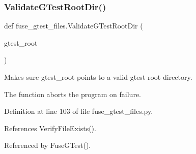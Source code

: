 \subsubsection{\texorpdfstring{Validate\+G\+Test\+Root\+Dir()}{ValidateGTestRootDir()}}
{\footnotesize\ttfamily def fuse\+\_\+gtest\+\_\+files.\+Validate\+G\+Test\+Root\+Dir (\begin{DoxyParamCaption}\item[{}]{gtest\+\_\+root }\end{DoxyParamCaption})}

\begin{DoxyVerb}Makes sure gtest_root points to a valid gtest root directory.

The function aborts the program on failure.
\end{DoxyVerb}
 

Definition at line 103 of file fuse\+\_\+gtest\+\_\+files.\+py.



References Verify\+File\+Exists().



Referenced by Fuse\+G\+Test().


